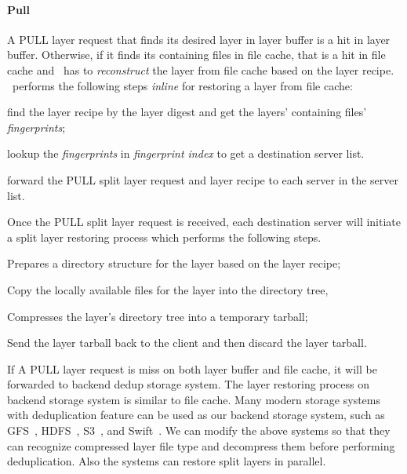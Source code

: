 \paragraph{Pull}
A PULL layer request that finds its desired layer in layer buffer is a hit in layer buffer. 
Otherwise, if it finds its containing files in file cache, that is a hit in file cache and
 \sysname~has to \emph{reconstruct} the layer from file cache based on the layer recipe.
%
%
\sysname\ performs the following steps \emph{inline} for restoring a layer from file cache:

\begin{compactenumerate}
	\item find the layer recipe by the layer digest and get the layers' containing files' \emph{fingerprints};
	\item lookup the \emph{fingerprints} in \emph{fingerprint index} to get a destination server list.
	\item forward the PULL split layer request and layer recipe to each server in the server list.
\end{compactenumerate}

Once the PULL split layer request is received, each destination server will initiate a split layer restoring process 
which performs the following steps.  

\begin{compactenumerate}
	\item Prepares a directory structure for the layer based on the layer recipe;
	\item Copy the locally available files for the layer into the directory tree, 
	\item Compresses the layer's directory tree into a temporary tarball;
	\item Send the layer tarball back to the client and then discard the layer tarball.
\end{compactenumerate}

If A PULL layer request is miss on both layer buffer and file cache, 
it will be forwarded to backend dedup storage system.
The layer restoring process on backend storage system is similar to file cache.
Many modern storage systems with deduplication feature can be used as our backend storage system, such as GFS~\cite{gfs}, HDFS~\cite{hdfs}, S3~\cite{s3}, and Swift~\cite{swift}.
We can modify the above systems so that they can recognize compressed layer file type and decompress them before performing deduplication.
Also the systems can restore split layers in parallel. 

